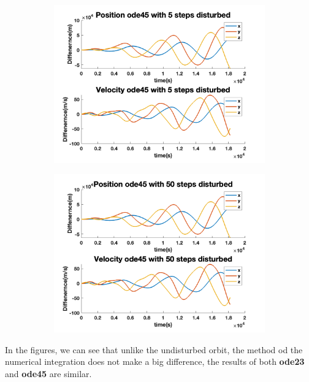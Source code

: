 \documentclass[12pt
,headinclude
,headsepline
,bibtotocnumbered
]{scrartcl}
\begin{document}
\begin{figure}[H]
\begin{subfigure}[b]{0.45\textwidth}
        \includegraphics[width=1\textwidth]{./plots/ode45_5_yprime_d.png}
        \end{subfigure}
        \begin{subfigure}[b]{0.45\textwidth}
        \includegraphics[width=1\textwidth]{./plots/ode45_50_yprime_d.png}
        \end{subfigure}
    \end{figure}
    In the figures, we can see that unlike the undisturbed orbit, the method od the numerical integration does not make a big difference, the results of both \textbf{ode23} and \textbf{ode45} are similar. 
\end{document}
